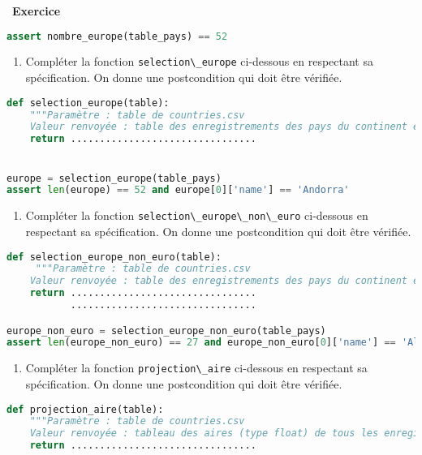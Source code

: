 \documentclass[
  11pt,
]{article}
\newcommand{\passthrough}[1]{#1}
\providecommand{\tightlist}{%
  \setlength{\itemsep}{0pt}\setlength{\parskip}{0pt}}
\newcounter{exo}
\newenvironment{exercice}[1]
{\par \medskip   \addtocounter{exo}{1} \noindent  
\begin{bclogo}[arrondi =0.1,   noborder = true, logo=\bccrayon, marge=4]{~\textbf{Exercice} \textbf{\theexo} {\itshape #1} }  \par}
{
\end{bclogo}
 \par \bigskip }
\newcounter{def}
\begin{document}
\begin{exercice}{}
\begin{lstlisting}[language=Python]
assert nombre_europe(table_pays) == 52
\end{lstlisting}

\begin{enumerate}
\def\labelenumi{\arabic{enumi}.}
\setcounter{enumi}{2}
\tightlist
\item
  Compléter la fonction \passthrough{\lstinline!selection\_europe!}
  ci-dessous en respectant sa spécification. On donne une postcondition
  qui doit être vérifiée.
\end{enumerate}

\begin{lstlisting}[language=Python]
def selection_europe(table):
    """Paramètre : table de countries.csv
    Valeur renvoyée : table des enregistrements des pays du continent européen"""
    return ................................


europe = selection_europe(table_pays)
assert len(europe) == 52 and europe[0]['name'] == 'Andorra'
\end{lstlisting}

\begin{enumerate}
\def\labelenumi{\arabic{enumi}.}
\setcounter{enumi}{3}
\tightlist
\item
  Compléter la fonction
  \passthrough{\lstinline!selection\_europe\_non\_euro!} ci-dessous en
  respectant sa spécification. On donne une postcondition qui doit être
  vérifiée.
\end{enumerate}

\begin{lstlisting}[language=Python]
def selection_europe_non_euro(table):
     """Paramètre : table de countries.csv
    Valeur renvoyée : table des enregistrements des pays du continent européen qui n'ont pas pour monnaie l'euro"""
    return ................................
           ................................

europe_non_euro = selection_europe_non_euro(table_pays)
assert len(europe_non_euro) == 27 and europe_non_euro[0]['name'] == 'Albania'
\end{lstlisting}

\begin{enumerate}
\def\labelenumi{\arabic{enumi}.}
\setcounter{enumi}{4}
\tightlist
\item
  Compléter la fonction \passthrough{\lstinline!projection\_aire!}
  ci-dessous en respectant sa spécification. On donne une postcondition
  qui doit être vérifiée.
\end{enumerate}

\begin{lstlisting}[language=Python]
def projection_aire(table):
    """Paramètre : table de countries.csv
    Valeur renvoyée : tableau des aires (type float) de tous les enregistrements"""
    return ................................


\end{lstlisting}
\end{exercice}
\end{document}
